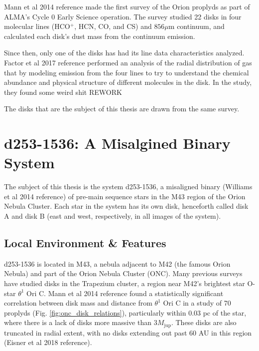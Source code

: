 Mann et al 2014 reference made the first survey of the Orion proplyds as part of ALMA's Cycle 0 Early Science operation. The survey studied 22 disks in four molecular lines (HCO$^+$, HCN, CO, and CS) and $856 \mu$m continuum, and calculated each disk's dust mass from the continuum emission.

Since then, only one of the disks has had its line data characteristics analyzed. Factor et al 2017 reference performed an analysis of the radial distribution of gas that by modeling emission from the four lines to try to understand the chemical abundance and physical structure of different molecules in the disk. In the study, they found some weird shit REWORK


The disks that are the subject of this thesis are drawn from the same survey.







\section{d253-1536: A Misalgined Binary System}

The subject of this thesis is the system d253-1536, a misaligned binary (Williams et al 2014 reference) of pre-main sequence stars in the M43 region of the Orion Nebula Cluster. Each star in the system has its own disk, henceforth called disk A and disk B (east and west, respectively, in all images of the system).

\subsection{Local Environment \& Features}
d253-1536 is located in M43, a nebula adjacent to M42 (the famous Orion Nebula) and part of the Orion Nebula Cluster (ONC). Many previous surveys have studied disks in the Trapezium cluster, a region near M42's brightest star O-star $\theta^1$ Ori C. Mann et al 2014 reference found a statistically significant correlation between disk mass and distance from $\theta^1$ Ori C in a study of 70 proplyds (Fig. \ref{fig:onc_disk_relations}), particularly within 0.03 pc of the star, where there is a lack of disks more massive than $3 M_\text{jup}$. These disks are also truncated in radial extent, with no disks extending out past 60 AU in this region (Eisner et al 2018 reference).


